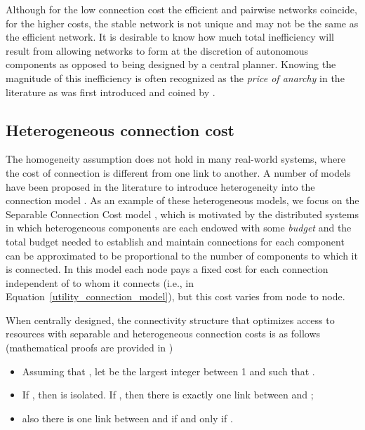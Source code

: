 \documentclass[journal,onecolumn]{IEEEtran}
\theoremstyle{plain}
\begin{document}
Although for the low connection cost the efficient and pairwise networks coincide, for the higher costs, the stable network is not unique and may not be the same as the efficient network. It is desirable to know how much total inefficiency will result from allowing networks to form at the discretion of autonomous components as opposed to being designed by a central planner. Knowing the magnitude of this inefficiency is often recognized as the \textit{price of anarchy} in the literature as was first introduced and coined by \cite{papadimitriou2001algorithms}. 



\subsection{Heterogeneous connection cost}

The homogeneity assumption does not hold in many real-world systems, where the cost of connection is different from one link to another. A number of models have been proposed in the literature to introduce heterogeneity into the connection model \citep{galeotti2006network, jackson2005economics, vandenbossche2013network}. As an example of these heterogeneous models, we focus on the Separable Connection Cost model \citep{heydari2015efficient}, which is motivated by the distributed systems in which heterogeneous components are each endowed with some \textit{budget} and the total budget needed to establish and maintain connections for each component can be approximated to be proportional to the number of components to which it is connected. In this model each node pays a fixed cost for each connection independent of to whom it connects (i.e.,  in Equation~\ref{utility_connection_model}), but this cost varies from node to node.

When centrally designed, the connectivity structure that optimizes access to resources with separable and heterogeneous connection costs is as follows (mathematical proofs are provided in \cite{heydari2015efficient} )
\begin{itemize}
\item Assuming that , let  be the largest integer between 1 and  such that . 
\item If , then  is isolated. If , then there is exactly one link between  and ; 
\item also there is one link between  and  if and only if .

\end{itemize}
\end{document}
